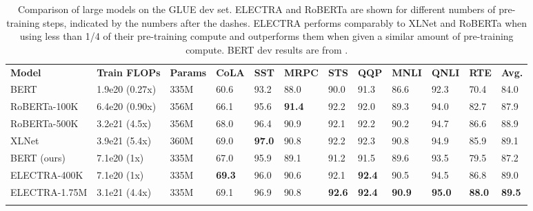 \documentclass{article}
\newcommand\tstrut{\rule{0pt}{2.6ex}}
\newcommand\bstrut{\rule[-1.0ex]{0pt}{0pt}}
\newcommand{\thinline}{\Xhline{1.5\arrayrulewidth}}
\newcommand{\thickline}{\Xhline{2.5\arrayrulewidth}}
\newcommand{\tsep}	{\bstrut \\ \thinline}
\newcommand{\ttop}{\thickline}
\newcommand{\tbottom}{\bstrut \\ \thickline}
\begin{document}
\addtolength{\tabcolsep}{-3.5pt}
\begin{table*}[t!]
\small
\begin{center}
\begin{tabularx}{\linewidth}{X l l l l l l l l l l l}
\ttop 
\textbf{Model} & \textbf{Train FLOPs} & \textbf{Params} & \textbf{CoLA} & \textbf{SST} & \textbf{MRPC} & \textbf{STS} & \textbf{QQP} & \textbf{MNLI} & \textbf{QNLI} & \textbf{RTE} & \textbf{Avg.} \tstrut \tsep 
BERT      &  1.9e20 (0.27x)  & 335M  & 60.6 & 93.2 & 88.0 & 90.0 & 91.3 & 86.6 & 92.3 & 70.4 & 84.0 \tstrut \\
RoBERTa-100K      &  6.4e20 (0.90x) & 356M    & 66.1 & 95.6 & \textbf{91.4} & 92.2 & 92.0 & 89.3 & 94.0 & 82.7& 87.9  \\
RoBERTa-500K      &  3.2e21 (4.5x) & 356M   & 68.0 & 96.4 & 90.9 & 92.1 & 92.2 & 90.2 & 94.7 & 86.6 & 88.9 \\
XLNet      & 3.9e21 (5.4x) &  360M  & 69.0 & \textbf{97.0} & 90.8 & 92.2 & 92.3 & 90.8 & 94.9 & 85.9 & 89.1 \tsep
BERT (ours) &  7.1e20 (1x) & 335M  & 67.0 & 95.9 & 89.1 & 91.2 & 91.5 & 89.6 & 93.5 & 79.5 & 87.2  \tstrut \\
ELECTRA-400K      &  7.1e20 (1x) & 335M    & \textbf{69.3} & 96.0 & 90.6 & 92.1 & \textbf{92.4} & 90.5 & 94.5 & 86.8 & 89.0 \\ 
ELECTRA-1.75M      &  3.1e21 (4.4x) & 335M    & 69.1 & 96.9 & 90.8 & \textbf{92.6} & \textbf{92.4} & \textbf{90.9} & \textbf{95.0} & \textbf{88.0} & \textbf{89.5} \tbottom

\end{tabularx} 
\end{center}
\vspace{-1mm}
\caption{Comparison of large models on the GLUE dev set. ELECTRA and RoBERTa are shown for different numbers of pre-training steps, indicated by the numbers after the dashes. ELECTRA performs comparably to XLNet and RoBERTa when using less than 1/4 of their pre-training compute and outperforms them when given a similar amount of pre-training compute. BERT dev results are from \citet{Clark2019BAMBM}.}
\label{tab:large}
\end{table*}
\addtolength{\tabcolsep}{3.5pt}
\vspace{-1mm}
\end{document}
